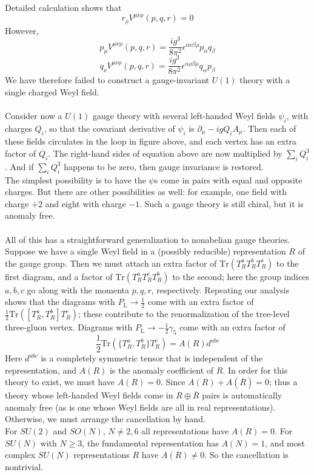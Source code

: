 \noindent
Detailed calculation shows that
\[r_{\rho}V^{\mu\nu\rho}(p,q,r) = 0\]
However,
\[p_{\mu}V^{\mu\nu\rho}(p,q,r) = \frac{ig^3}{8\pi^2}\epsilon^{\alpha\nu\beta\rho}p_{\alpha}q_{\beta}\]
\[q_{\nu}V^{\mu\nu\rho}(p,q,r) = \frac{ig^3}{8\pi^2}\epsilon^{\alpha\rho\beta\mu}q_{\alpha}p_{\beta}\]
We have therefore failed to construct a gauge-invariant $U(1)$ theory with a single charged Weyl field.
\\ \\
Consider now a $U(1)$ gauge theory with several left-handed Weyl fields $\psi_i$, with charges $Q_i$, so that the covariant derivative of $\psi_i$ is $\partial_{\mu} - igQ_iA_{\mu}$. Then each of these fields circulates in the loop in figure above, and each vertex has an extra factor of $Q_i$. The right-hand sides of equation above are now multiplied by $\sum_i Q_i^3$. And if $\sum_i Q_i^3$ happens to be zero, then gauge invariance is restored. 
\\
The simplest possibility is to have the $\psi$s come in
pairs with equal and opposite charges. But there are other possibilities as well: for example, one field with charge $+2$ and eight with charge $-1$. Such a gauge theory is still chiral, but it is anomaly free.
\\ \\
All of this has a straightforward generalization to nonabelian gauge theories. 
Suppose we have a single Weyl field in a (possibly reducible) representation $R$ of the gauge group. Then we must attach an extra factor of $\mathrm{Tr}(T^a_R T^b_R T^c_R)$ to the first diagram, and a factor of $\mathrm{Tr}(T^a_R T^c_R T^b_R)$ to the second; here the group indices $a,b,c$ go along with the momenta $p,q,r$, respectively.
Repeating our analysis shows that the diagrams with $P_{\mathrm{L}} \to \frac{1}{2}$ come with an extra factor of $\frac{1}{2}\mathrm{Tr}([T^a_R, T^b_R] T^c_R)$; these contribute to the renormalization of the tree-level three-gluon vertex. Diagrams with $P_{\mathrm{L}} \to - \frac{1}{2}\gamma_5$ come with an extra factor of
\[\frac{1}{2}\mathrm{Tr}(\{T^a_R, T^b_R\} T^c_R) = A(R)d^{abc}\]
Here $d^{abc}$ is a completely symmetric tensor that is independent of the representation, and $A(R)$ is the anomaly coefficient of $R$. In order for this theory to exist, we must have $A(R) = 0$. 
Since $A(R) + A(\overline{R}) = 0$; thus a theory whose left-handed Weyl fields come in $R \oplus \overline{R}$ pairs is automatically anomaly free (as is one whose Weyl fields are all in real representations). Otherwise, we must arrange the cancellation by hand. 
\\
For $SU(2)$ and $SO(N)$, $N \neq 2,6$ all representations have $A(R) = 0$. For $SU(N)$ with $N \geq 3$, the fundamental representation has $A(N) = 1$, and most complex $SU(N)$ representations $R$ have $A(R) \neq 0$. So the cancellation is nontrivial.

